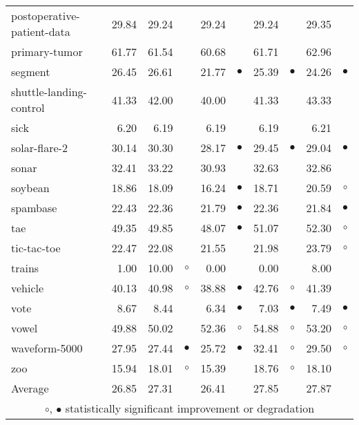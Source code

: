 {\begin{longtable}{lrr@{\hspace{0.1cm}}cr@{\hspace{0.1cm}}cr@{\hspace{0.1cm}}cr@{\hspace{0.1cm}}c}
postoperative-patient-data & 29.84 & 29.24 &           & 29.24 &           & 29.24 &           & 29.35 &          \\
primary-tumor & 61.77 & 61.54 &           & 60.68 &           & 61.71 &           & 62.96 &          \\
segment & 26.45 & 26.61 &           & 21.77 & $\bullet$ & 25.39 & $\bullet$ & 24.26 & $\bullet$\\
shuttle-landing-control & 41.33 & 42.00 &           & 40.00 &           & 41.33 &           & 43.33 &          \\
sick &  6.20 &  6.19 &           &  6.19 &           &  6.19 &           &  6.21 &          \\
solar-flare-2 & 30.14 & 30.30 &           & 28.17 & $\bullet$ & 29.45 & $\bullet$ & 29.04 & $\bullet$\\
sonar & 32.41 & 33.22 &           & 30.93 &           & 32.63 &           & 32.86 &          \\
soybean & 18.86 & 18.09 &           & 16.24 & $\bullet$ & 18.71 &           & 20.59 &   $\circ$\\
spambase & 22.43 & 22.36 &           & 21.79 & $\bullet$ & 22.36 &           & 21.84 & $\bullet$\\
tae & 49.35 & 49.85 &           & 48.07 & $\bullet$ & 51.07 &           & 52.30 &   $\circ$\\
tic-tac-toe & 22.47 & 22.08 &           & 21.55 &           & 21.98 &           & 23.79 &   $\circ$\\
trains &  1.00 & 10.00 &   $\circ$ &  0.00 &           &  0.00 &           &  8.00 &          \\
vehicle & 40.13 & 40.98 &   $\circ$ & 38.88 & $\bullet$ & 42.76 &   $\circ$ & 41.39 &          \\
vote &  8.67 &  8.44 &           &  6.34 & $\bullet$ &  7.03 & $\bullet$ &  7.49 & $\bullet$\\
vowel & 49.88 & 50.02 &           & 52.36 &   $\circ$ & 54.88 &   $\circ$ & 53.20 &   $\circ$\\
waveform-5000 & 27.95 & 27.44 & $\bullet$ & 25.72 & $\bullet$ & 32.41 &   $\circ$ & 29.50 &   $\circ$\\
zoo & 15.94 & 18.01 &   $\circ$ & 15.39 &           & 18.76 &   $\circ$ & 18.10 &          \\
\hline
Average & 26.85 & 27.31 &           & 26.41 &           & 27.85 &           & 27.87 &          \\
\hline
\multicolumn{10}{c}{$\circ$, $\bullet$ statistically significant improvement or degradation}\\
\end{longtable} \footnotesize \par}
